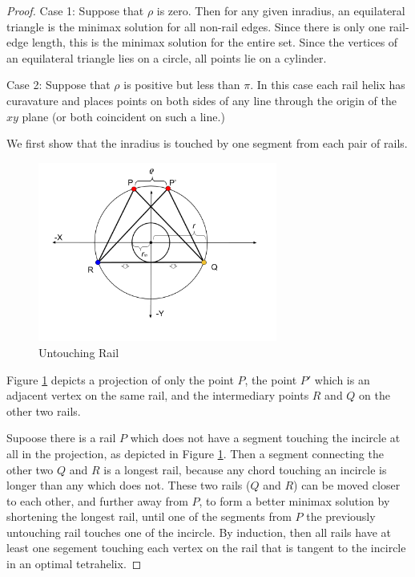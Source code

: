 \documentclass[11pt]{article}
\begin{document}
\begin{proof}

Case 1: Suppose that $\rho$ is zero. Then for any given inradius, an equilateral
triangle is the minimax solution for all non-rail edges. Since there is only
one rail-edge length, this is the minimax solution for the entire set. Since
the vertices of an equilateral triangle lies on a circle, all points lie on
a cylinder.

Case 2: Suppose that $\rho$ is positive but less than $\pi$.
In this case each rail helix has
curavature and places points on both sides of any line through the origin
of the $xy$ plane (or both coincident on such a line.)

We first show that the inradius is touched by one segment from each pair
of rails.

\begin{figure}[H]
     \centering
     \includegraphics[width=0.7\textwidth]{figures/UntouchingRail.png}
     \caption{Untouching Rail}
  \label{untouchingrailfig}
\end{figure}

Figure \ref{untouchingrailfig} depicts a projection of
only the point $P$, the point $P'$ which is an adjacent vertex on the same rail,
and the intermediary points $R$ and $Q$ on the other two rails.

Supoose there is a rail $P$ which does not have a segment touching the incircle
at all in the projection, as depicted in Figure \ref{untouchingrailfig}.
Then a segment connecting the other two $Q$ and $R$ is a longest
rail, because any chord touching an incircle is longer than any which does not.
These two rails ($Q$ and $R$) can be moved closer to each other, and further away from $P$, to form a better minimax solution
by shortening the longest rail, until one of the segments from $P$ the previously
untouching rail touches one of the incircle. By induction, then all rails have
at least one segement touching each vertex on the rail that is tangent to the
incircle in an optimal tetrahelix.


\end{proof}
\end{document}
